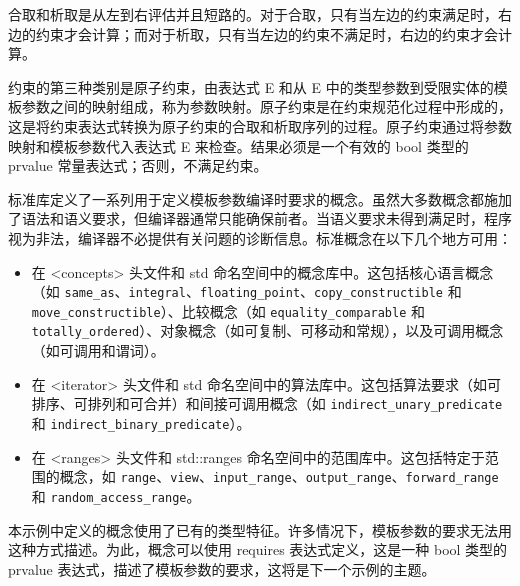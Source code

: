合取和析取是从左到右评估并且短路的。对于合取，只有当左边的约束满足时，右边的约束才会计算；而对于析取，只有当左边的约束不满足时，右边的约束才会计算。

\begin{myNotic}
约束的第三种类别是原子约束，由表达式 E 和从 E 中的类型参数到受限实体的模板参数之间的映射组成，称为参数映射。原子约束是在约束规范化过程中形成的，这是将约束表达式转换为原子约束的合取和析取序列的过程。原子约束通过将参数映射和模板参数代入表达式 E 来检查。结果必须是一个有效的 bool 类型的 prvalue 常量表达式；否则，不满足约束。
\end{myNotic}

标准库定义了一系列用于定义模板参数编译时要求的概念。虽然大多数概念都施加了语法和语义要求，但编译器通常只能确保前者。当语义要求未得到满足时，程序视为非法，编译器不必提供有关问题的诊断信息。标准概念在以下几个地方可用：

\begin{itemize}
\item
在 <concepts> 头文件和 std 命名空间中的概念库中。这包括核心语言概念（如 \verb|same_as|、\verb|integral|、\verb|floating_point|、\verb|copy_constructible| 和 \verb|move_constructible|）、比较概念（如 \verb|equality_comparable| 和 \verb|totally_ordered|）、对象概念（如可复制、可移动和常规），以及可调用概念（如可调用和谓词）。

\item
在 <iterator> 头文件和 std 命名空间中的算法库中。这包括算法要求（如可排序、可排列和可合并）和间接可调用概念（如 \verb|indirect_unary_predicate| 和 \verb|indirect_binary_predicate|）。

\item
在 <ranges> 头文件和 std::ranges 命名空间中的范围库中。这包括特定于范围的概念，如 \verb|range|、\verb|view|、\verb|input_range|、\verb|output_range|、\verb|forward_range| 和 \verb|random_access_range|。
\end{itemize}


本示例中定义的概念使用了已有的类型特征。许多情况下，模板参数的要求无法用这种方式描述。为此，概念可以使用 requires 表达式定义，这是一种 bool 类型的 prvalue 表达式，描述了模板参数的要求，这将是下一个示例的主题。


